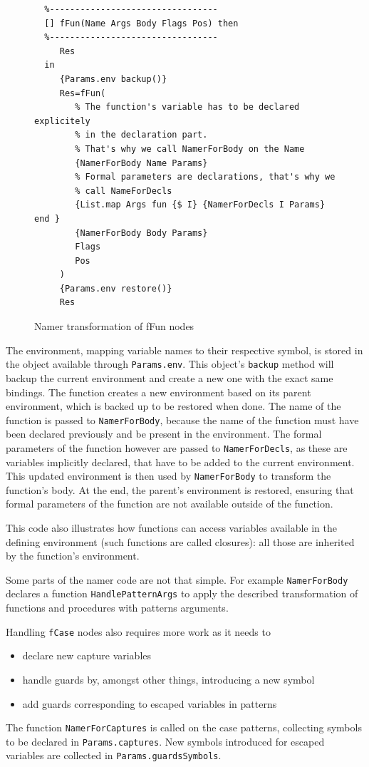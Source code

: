 \documentclass[a4paper]{memoir}
\begin{document}
\begin{figure}[h]
\begin{lstlisting}
  %---------------------------------
  [] fFun(Name Args Body Flags Pos) then
  %---------------------------------
     Res
  in
     {Params.env backup()} 
     Res=fFun(
        % The function's variable has to be declared explicitely 
        % in the declaration part.
        % That's why we call NamerForBody on the Name
        {NamerForBody Name Params}
        % Formal parameters are declarations, that's why we 
        % call NameForDecls
        {List.map Args fun {$ I} {NamerForDecls I Params} end }
        {NamerForBody Body Params}
        Flags
        Pos
     )
     {Params.env restore()}
     Res
\end{lstlisting}
\caption{Namer transformation of fFun nodes}
\label{fig:namer:ffun}
\end{figure}


The environment, mapping variable names to their respective symbol, is stored in
the object available through \lstinline!Params.env!. This object's
\lstinline!backup! method will backup the current environment and create a new
one with the exact same bindings.
The function creates a new environment based on its parent environment, which is
backed up to be restored when done. The name of the function is passed to \lstinline!NamerForBody!, because the name of the function must have been declared previously and be present in the environment. 
The formal parameters of the function however are passed to \lstinline!NamerForDecls!, as these are variables implicitly declared, that have to be added to the current environment. This updated environment is then used by \lstinline!NamerForBody! to transform the function's body.
At the end, the parent's environment is restored, ensuring that formal parameters of the function are not available outside of the function.

This code also illustrates how functions can access variables
available in the defining environment (such functions are called closures): all
those are inherited by the function's environment.

Some parts of the namer code are not that simple. For example \lstinline!NamerForBody! 
declares a function \lstinline!HandlePatternArgs!
to apply the described transformation of functions and procedures with patterns
arguments. 

Handling \lstinline!fCase! nodes also requires more work as it needs to 
\nopagebreak[4]
\begin{itemize}
  \item declare new capture variables
  \item handle guards by, amongst other things, introducing a new symbol
  \item add guards corresponding to escaped variables in patterns
\end{itemize}
The function \lstinline!NamerForCaptures! is called on the case patterns, collecting symbols
to be declared in \lstinline!Params.captures!.
New symbols introduced for escaped variables are collected in
\lstinline!Params.guardsSymbols!. 
\end{document}
